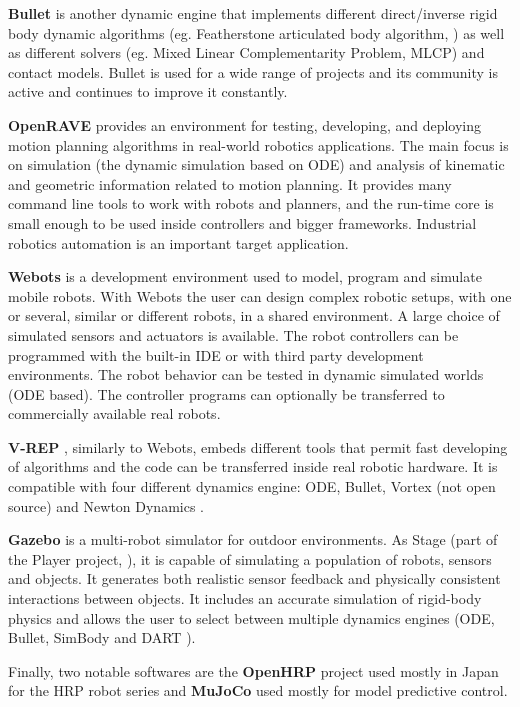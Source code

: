 \textbf{Bullet} \cite{Coumans:03} is another dynamic engine that implements different direct/inverse rigid body dynamic algorithms (eg. Featherstone articulated body algorithm, \cite{Featherstone:07}) as well as different solvers (eg. Mixed Linear Complementarity Problem, MLCP) and contact models. Bullet is used for a wide range of projects and its community is active and continues to improve it constantly.

\textbf{OpenRAVE} \cite{Diankov:10} provides an environment for testing, developing, and deploying motion planning algorithms in real-world robotics applications. The main focus is on simulation (the dynamic simulation based on ODE) and analysis of kinematic and geometric information related to motion planning. It provides many command line tools to work with robots and planners, and the run-time core is small enough to be used inside controllers and bigger frameworks. Industrial robotics automation is an important target application.

\textbf{Webots}  \cite{Michel:04} is a development environment used to model, program and simulate mobile robots. With Webots the user can design complex robotic setups, with one or several, similar or different robots, in a shared environment. A large choice of simulated sensors and actuators is available. The robot controllers can be programmed with the built-in IDE or with third party development environments. The robot behavior can be tested in dynamic simulated worlds (ODE based). The controller programs can optionally be transferred to commercially available real robots.

\textbf{V-REP} \cite{Rohmer:13}, similarly to Webots, embeds different tools that permit fast developing of algorithms and the code can be transferred inside real robotic hardware. It is compatible with four different dynamics engine: ODE, Bullet, Vortex \cite{VORTEX:13} (not open source) and Newton Dynamics \cite{NEWTON:13}.

\textbf{Gazebo} \cite{Koenig:04} is a multi-robot simulator for outdoor environments. As Stage (part of the Player project, \cite{Gerkey:03}), it is capable of simulating a population of robots, sensors and objects. It generates both realistic sensor feedback and physically consistent interactions between objects. It includes an accurate simulation of rigid-body physics and allows the user to select between multiple dynamics engines (ODE, Bullet, SimBody \cite{Sherman} and DART \cite{DART:13}). 

Finally, two notable softwares are the \textbf{OpenHRP} project used mostly in Japan for the HRP robot series \cite{Kanehiro:04} and \textbf{MuJoCo} \cite{Todorov:12} used mostly for model predictive control.

